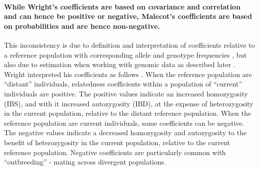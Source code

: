 \paragraph{While Wright's coefficients are based on covariance and
correlation and can hence be positive or negative,
Malecot's coefficients are based on probabilities and are hence
non-negative.}
%
This inconsistency is due to definition and interpretation of coefficients
relative to a reference population
with corresponding allele and genotype frequencies
\citep{wright1965interpretation, jacquard1975inbreeding,
slatkin2002modern, rousset2002inbreeding, powell2010reconciling}, 
but also due to estimation when working with genomic data as described later
\citep[e.g.][]{wang2014marker, weir2017unified, ackerman2017estimating}.
%
Wright interpreted his coefficients as follows
\citep{wright1949genetical, wright1965interpretation}.
%
When the reference population are ``distant'' individuals,
relatedness coefficients within a population of ``current''
individuals are positive.
%
The positive values indicate an increased homozygosity (IBS),
and with it increased autozygosity (IBD),
at the expense of heterozygosity in the current population,
relative to the distant reference population.
%
When the reference population are current individuals,
some coefficients can be negative.
%
The negative values indicate a decreased homozygosity and autozygosity
to the benefit of heterozygosity in the current population, relative
to the current reference population.
%
Negative coefficients are particularly common with ``outbreeding''
- mating across divergent populations.

